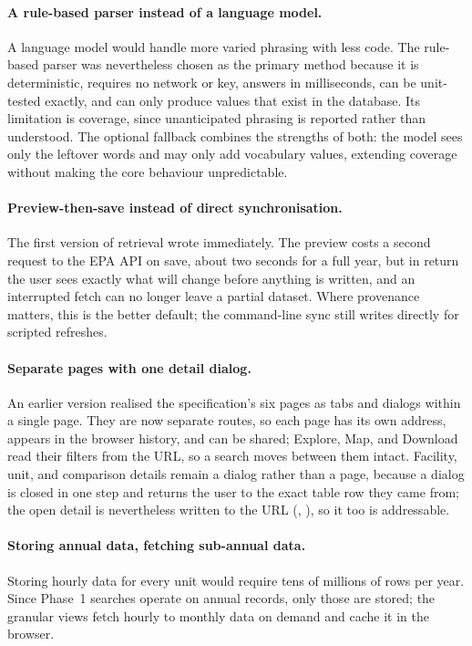 \documentclass[11pt,a4paper]{article}
\begin{document}
\paragraph{A rule-based parser instead of a language model.} A language model would handle more
varied phrasing with less code. The rule-based parser was nevertheless chosen as the primary
method because it is deterministic, requires no network or key, answers in milliseconds, can be
unit-tested exactly, and can only produce values that exist in the database. Its limitation is
coverage, since unanticipated phrasing is reported rather than understood. The optional fallback
combines the strengths of both: the model sees only the leftover words and may only add
vocabulary values, extending coverage without making the core behaviour unpredictable.

\paragraph{Preview-then-save instead of direct synchronisation.} The first version of retrieval
wrote immediately. The preview costs a second request to the EPA API on save, about two seconds
for a full year, but in return the user sees exactly what will change before anything is
written, and an interrupted fetch can no longer leave a partial dataset. Where provenance
matters, this is the better default; the command-line sync still writes directly for scripted
refreshes.

\paragraph{Separate pages with one detail dialog.} An earlier version realised the
specification's six pages as tabs and dialogs within a single page. They are now separate
routes, so each page has its own address, appears in the browser history, and can be shared;
Explore, Map, and Download read their filters from the URL, so a search moves between them
intact. Facility, unit, and comparison details remain a dialog rather than a page, because a
dialog is closed in one step and returns the user to the exact table row they came from; the
open detail is nevertheless written to the URL (, ), so it too is
addressable.

\paragraph{Storing annual data, fetching sub-annual data.} Storing hourly data for every unit
would require tens of millions of rows per year. Since Phase~1 searches operate on annual
records, only those are stored; the granular views fetch hourly to monthly data on demand and
cache it in the browser.
\end{document}
